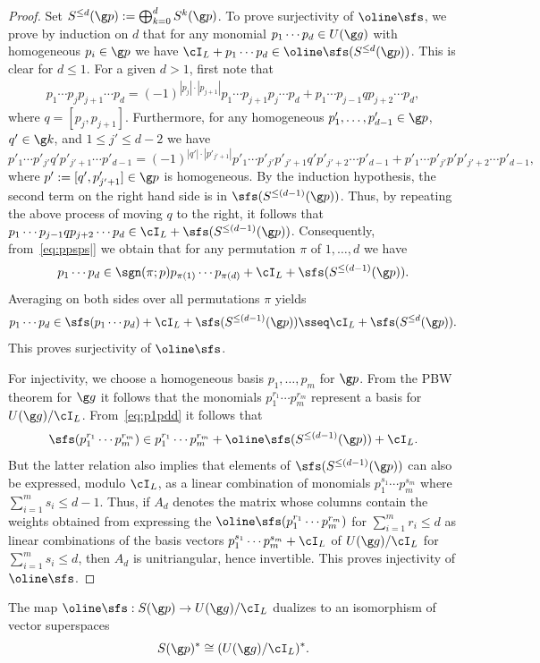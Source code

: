 \documentclass[11pt]{amsart}
\begin{document}
\begin{proof}
Set $S^{\leq d}(\g p):=\bigoplus_{k=0}^d S^k(\g p)$. To prove surjectivity of $\oline \sfs$, we prove by induction on $d$ that for any monomial $p_1\cdots p_d\in U(\g g)$ with homogeneous $p_i\in\g p$ we have  $\cI_L+p_1\cdots p_d\in \oline \sfs(S^{\leq d}(\g p))$. 
This is clear for $d\leq 1$. For a given $d>1$, first note that
\begin{align}
\label{eq:ppsps|}
p_1\cdots p_jp_{j+1}\cdots p_d=
(-1)^{|p_j|\cdot|p_{j+1}|} p_1\cdots p_{j+1}p_j\cdots p_d+
p_1\cdots p_{j-1}qp_{j+2}\cdots p_d
,\end{align}
 where $q=[p_j,p_{j+1}]$. 
 Furthermore, for any homogeneous $p'_1,\ldots,p'_{d-1}\in\g p$, $q'\in \g k$, and  $1\leq j'\leq d-2$ we have
 \[
 p'_1\cdots p'_{j'}q'p'_{j'+1}\cdots p'_{d-1}=
(-1)^{|q'|\cdot |p'_{j'+1}|} 
  p'_1\cdots p'_{j'}p'_{j'+1}q'p'_{j'+2}\cdots p'_{d-1}+p'_1\cdots p'_{j'}p'p'_{j'+2}\cdots p'_{d-1},
 \]
where $p':=[q',p'_{j'+1}]\in \g p$ is homogeneous. By the induction hypothesis, the second term on the right hand side is in $\sfs(S^{\leq (d-1)}(\g p))$. Thus, by repeating the above process of moving $q$ to the right, it follows that 
$p_1\cdots p_{j-1}qp_{j+2}\cdots p_d\in \cI_L+\sfs(S^{\leq (d-1)}(\g p))$. Consequently, from~\eqref{eq:ppsps|} we obtain that for any permutation $\pi$ of $1,\ldots,d$ we have
\[
p_1\cdots p_d\in
\sgn(\pi;p)p_{\pi(1)}\cdots p_{\pi(d)}+\cI_L+\sfs(S^{\leq (d-1)}(\g p)).
\]
Averaging on both sides over all permutations $\pi$ yields
\begin{equation}
\label{eq:p1pdd}
p_1\cdots p_d\in \sfs(p_1\cdots p_d)+\cI_L+
\sfs(S^{\leq (d-1)}(\g p))\sseq\cI_L+
\sfs(S^{\leq d}(\g p)).
\end{equation}
This proves surjectivity of $\oline \sfs$.

For injectivity, we choose a homogeneous basis $p_1,\ldots,p_m$ for $\g p$. From the PBW theorem for $\g g$ it follows that the monomials $p_1^{r_1}\cdots p_m^{r_m}$ represent a basis for $U(\g g)/\cI_L$. 
From~\eqref{eq:p1pdd} it follows that 
\[
\sfs(p_1^{r_1}\cdots p_m^{r_m})\in p_1^{r_1}\cdots p_m^{r_m}+\oline\sfs(S^{\leq(d-1)}(\g p))+\cI_L.
\]
But the latter relation also implies that elements of 
$\sfs(S^{\leq(d-1)}(\g p))$ can also be expressed, modulo $\cI_L$, as a linear combination of monomials $p_1^{s_1}\cdots p_m^{s_m}$ where $\sum_{i=1}^m s_i\leq d-1$. Thus, if $A_d$ denotes the matrix whose columns contain the weights obtained from expressing the 
$\oline \sfs(p_1^{r_1}\cdots p_m^{r_m})$ for $\sum_{i=1}^m r_i\leq d$ as linear combinations of the basis vectors $p_1^{s_1}\cdots p_m^{s_m}+\cI_L$ of $U(\g g)/\cI_L$ for $\sum_{i=1}^ms_i\leq d$, then $A_d$ is  unitriangular, hence invertible. This proves injectivity of $\oline \sfs$. 
\end{proof}
\begin{cor}
The map
	$
	\oline\sfs:S(\g p)\to U(\g g)/\cI_L
	$
 dualizes to an isomorphism of vector superspaces 
	\[
	S(\g p)^*\cong (U(\g g)/\cI_L)^*.
	\] 
\end{cor}
\end{document}
